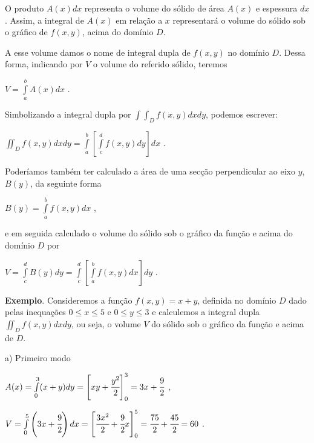 			O produto $A(x)dx$ representa o volume do sólido de área $A(x)$ e espessura $dx$. Assim, a integral de $A(x)$ em relação a $x$ representará o volume do sólido sob o gráfico de $f(x, y)$, acima do domínio $D$.

			A esse volume damos o nome de integral dupla de $f(x, y)$ no domínio $D$. Dessa forma, indicando por $V$ o volume do referido sólido, teremos

			\medskip

			$V = \int \limits^{b}_{a} A(x)dx$ .

			\medskip

			Simbolizando a integral dupla por $\int \int_{D} f(x, y)dxdy$, podemos escrever:

			\bigskip

			{\LARGE $\iint_{D} f(x, y)dxdy = \int \limits^{b}_{a} \left[ \int \limits^{d}_{c} f(x, y)dy \right] dx$} . 

			\bigskip

			Poderíamos também ter calculado a área de uma secção perpendicular ao eixo $y$, $B(y)$, da seguinte forma

			\medskip

			$B(y) = \int \limits^{b}_{a} f(x, y)dx$ ,

			\medskip

			e em seguida calculado o volume do sólido sob o gráfico da função e acima do domínio $D$ por

			\medskip

			$V = \int \limits^{d}_{c} B(y)dy = \int \limits^{d}_{c} \left[ \int \limits^{b}_{a} f(x, y)dx \right] dy$ .

			\bigskip

			\textbf{Exemplo}. Consideremos a função $f(x, y) = x + y$, definida no domínio $D$ dado pelas inequações $0 \leq x \leq 5$ e $0 \leq y \leq 3$ e calculemos a integral dupla $\iint _{D} f(x, y)dxdy$, ou seja, o volume $V$ do sólido sob o gráfico da função e acima de $D$.

			\medskip

			a) Primeiro modo

			\medskip

			$A(x) = \int \limits^{3}_{0} (x + y)dy = \left[ xy + \cfrac{y^{2}}{2} \right]^{3}_{0} = 3x + \cfrac{9}{2}$ ,

			$V = \int \limits^{5}_{0} \left( 3x + \cfrac{9}{2} \right) dx = \left[ \cfrac{3x^{2}}{2} + \cfrac{9}{2} x \right]^{5}_{0} = \cfrac{75}{2} + \cfrac{45}{2} = 60$ .

			\bigskip

